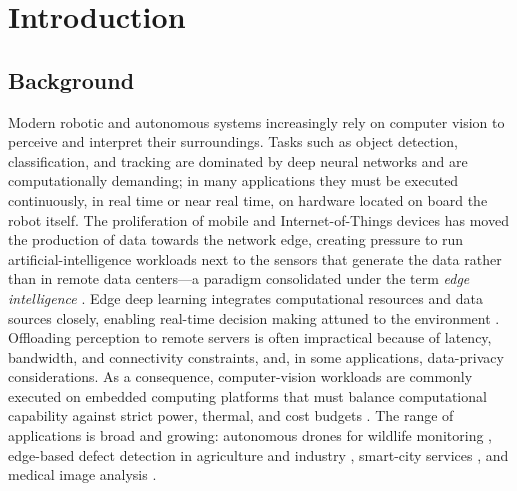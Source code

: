 %

\chapter{Introduction}
\label{chap:introduction}

\section{Background}
\label{sec:background}

Modern robotic and autonomous systems increasingly rely on computer vision
to perceive and interpret their surroundings. Tasks such as object
detection, classification, and tracking are dominated by deep neural
networks and are computationally demanding; in many applications they must
be executed continuously, in real time or near real time, on hardware
located on board the robot itself. The proliferation of mobile and
Internet-of-Things devices has moved the production of data towards the
network edge, creating pressure to run artificial-intelligence workloads
next to the sensors that generate the data rather than in remote data
centers---a paradigm consolidated under the term \emph{edge intelligence}
\cite{zhou2019, deng2020}. Edge deep learning integrates computational
resources and data sources closely, enabling real-time decision making
attuned to the environment \cite{xu2025}. Offloading perception to remote
servers is often impractical because of latency, bandwidth, and connectivity
constraints, and, in some applications, data-privacy considerations.
As a consequence, computer-vision workloads are commonly executed on
embedded computing platforms that must balance computational capability
against strict power, thermal, and cost budgets \cite{zhou2019, xu2025}.
The range of applications is broad and growing: autonomous drones for
wildlife monitoring \cite{lundquist2026}, edge-based defect detection in
agriculture and industry \cite{muchtar2025, machado2025}, smart-city
services \cite{woo2025}, and medical image analysis \cite{aalishah2025}.

